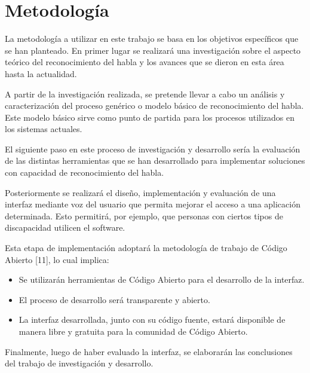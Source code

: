 \section{Metodolog\'{i}a}
\label{sec:metodologia}

La metodolog\'{i}a a utilizar en este trabajo se basa en los objetivos espec\'{i}ficos que se 
han planteado. En primer lugar se realizar\'{a} una investigaci\'{o}n sobre el aspecto te\'{o}rico 
del reconocimiento del habla y los avances que se dieron en esta \'{a}rea hasta la actualidad.

A partir de la investigaci\'{o}n realizada, se pretende llevar a cabo un an\'{a}lisis y 
caracterizaci\'{o}n del proceso gen\'{e}rico o modelo b\'{a}sico de reconocimiento del habla. 
Este modelo b\'{a}sico sirve como punto de partida para los procesos utilizados en los sistemas actuales.

El siguiente paso en este proceso de investigaci\'{o}n y desarrollo ser\'{i}a la evaluaci\'{o}n de las 
distintas herramientas que se han desarrollado para implementar soluciones con 
capacidad de reconocimiento del habla.

Posteriormente se realizar\'{a} el dise\~{n}o, implementaci\'{o}n y evaluaci\'{o}n de una interfaz mediante
voz del usuario que permita mejorar el acceso a una aplicaci\'{o}n determinada. Esto permitir\'{a}, por ejemplo, 
que personas con ciertos tipos de discapacidad utilicen el software. 

Esta etapa de implementaci\'{o}n adoptar\'{a} la metodolog\'{i}a de trabajo de C\'{o}digo Abierto [11], lo cual 
implica:  

\begin{itemize}
    \item Se utilizar\'{a}n herramientas de C\'{o}digo Abierto para el desarrollo de la interfaz. 

    \item El proceso de desarrollo ser\'{a} transparente y abierto. 
    
    \item La interfaz desarrollada, junto con su c\'{o}digo fuente, estar\'{a} disponible de manera libre 
    y gratuita para la comunidad de C\'{o}digo Abierto.
\end{itemize}

Finalmente, luego de haber evaluado la interfaz, se elaborar\'{a}n las conclusiones del trabajo de 
investigaci\'{o}n y desarrollo.
